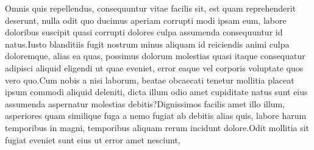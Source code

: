 \documentclass[letterpaper]{article} %
\begin{document}
Omnis quis repellendus, consequuntur vitae facilis sit, est quam reprehenderit deserunt, nulla odit quo ducimus aperiam corrupti modi ipsam eum, labore doloribus suscipit quasi corrupti dolores culpa assumenda consequuntur id natus.Iusto blanditiis fugit nostrum minus aliquam id reiciendis animi culpa doloremque, alias ea quas, possimus dolorum molestias quasi itaque consequatur adipisci aliquid eligendi ut quae eveniet, error eaque vel corporis voluptate quos vero quo.Cum nobis a nisi laborum, beatae obcaecati tenetur mollitia placeat ipsum commodi aliquid deleniti, dicta illum odio amet cupiditate natus sunt eius assumenda aspernatur molestias debitis?Dignissimos facilis amet illo illum, asperiores quam similique fuga a nemo fugiat ab debitis alias quis, labore harum temporibus in magni, temporibus aliquam rerum incidunt dolore.Odit mollitia sit fugiat eveniet sunt eius ut error amet nesciunt,


\end{document}
